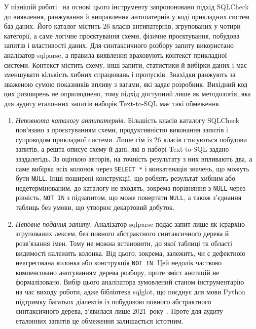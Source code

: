 \documentclass[a4paper,14pt,oneside]{extreport}
\begin{document}
У пізнішій роботі~\cite{dintyala2020sqlcheck} на основі цього інструменту запропоновано підхід SQLCheck до виявлення, ранжування й виправлення антипатернів у коді прикладних систем баз даних. Його каталог містить 26 класів антипатернів, згрупованих у чотири категорії, а саме логічне проєктування схеми, фізичне проєктування, побудова запитів і властивості даних. Для синтаксичного розбору запиту використано аналізатор sqlparse, а правила виявлення враховують контекст прикладної системи. Контекст містить схему, інші запити, статистики й вибірки даних і має зменшувати кількість хибних спрацювань і пропусків. Знахідки ранжують за зваженою сумою показників впливу з вагами, які задає розробник. Вихідний код цих розширень не оприлюднено, тому підхід доступний лише як методологія, яка для аудиту еталонних запитів наборів Text-to-SQL має такі обмеження.
\begin{enumerate}\setlength{\itemsep}{0pt}\setlength{\parsep}{0pt}\setlength{\parskip}{0pt}
\item \textit{Неповнота каталогу антипатернів.} Більшість класів каталогу SQLCheck пов'язано з проєктуванням схеми, продуктивністю виконання запитів і супроводом прикладної системи. Лише сім із 26 класів стосуються побудови запитів, а решта описує схему й дані, які в наборі Text-to-SQL задано заздалегідь. За оцінкою авторів, на точність результату з них впливають два, а саме вибірка всіх колонок через \texttt{SELECT~*} і конкатенація значень, що можуть бути \texttt{NULL}. Інші поширені конструкції, що роблять результат хибним або недетермінованим, до каталогу не входять, зокрема порівняння з \texttt{NULL} через рівність, \texttt{NOT~IN} з підзапитом, що може повертати \texttt{NULL}, а також з'єднання таблиць без умови, що утворює декартовий добуток.
\item \textit{Неповне подання запиту.} Аналізатор sqlparse подає запит лише як ієрархію згрупованих лексем, без повного абстрактного синтаксичного дерева й розв'язання імен. Тому не можна встановити, до якої таблиці та області видимості належить колонка. Від цього, зокрема, залежить, чи є дефектною неагрегована колонка або конструкція \texttt{NOT~IN}. Цей недолік частково компенсовано анотуванням дерева розбору, проте зміст анотацій не формалізовано. Вибір цього аналізатора зумовлений станом інструментарію на час виходу роботи, адже бібліотека sqlglot, що поєднує для мови Python підтримку багатьох діалектів із побудовою повного абстрактного синтаксичного дерева, з'явилася лише 2021~року~\cite{sqlglot}. Проте для аудиту еталонних запитів це обмеження залишається істотним.

\end{enumerate}
\end{document}
